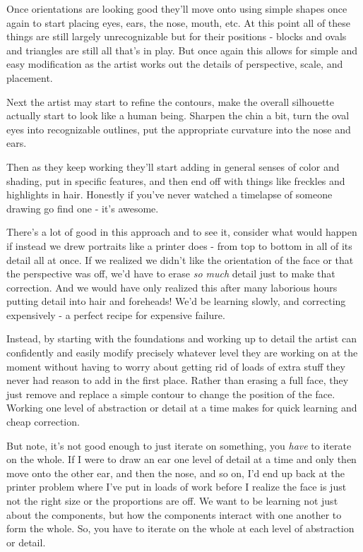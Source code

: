 \documentclass[11pt,a5paper]{book}
\begin{document}
Once orientations are looking good they'll move onto using simple shapes once again to start placing eyes, ears, the nose, mouth, etc. At this point all of these things are still largely unrecognizable but for their positions - blocks and ovals and triangles are still all that's in play. But once again this allows for simple and easy modification as the artist works out the details of perspective, scale, and placement.
\newline

Next the artist may start to refine the contours, make the overall silhouette actually start to look like a human being. Sharpen the chin a bit, turn the oval eyes into recognizable outlines, put the appropriate curvature into the nose and ears. 
\newline

Then as they keep working they'll start adding in general senses of color and shading, put in specific features, and then end off with things like freckles and highlights in hair. Honestly if you've never watched a timelapse of someone drawing go find one - it's awesome.
\newline

There's a lot of good in this approach and to see it, consider what would happen if instead we drew portraits like a printer does - from top to bottom in all of its detail all at once. If we realized we didn't like the orientation of the face or that the perspective was off, we'd have to erase \textit{so much} detail just to make that correction. And we would have only realized this after many laborious hours putting detail into hair and foreheads! We'd be learning slowly, and correcting expensively - a perfect recipe for expensive failure. 
\newline

Instead, by starting with the foundations and working up to detail the artist can confidently and easily modify precisely whatever level they are working on at the moment without having to worry about getting rid of loads of extra stuff they never had reason to add in the first place. Rather than erasing a full face, they just remove and replace a simple contour to change the position of the face. Working one level of abstraction or detail at a time makes for quick learning and cheap correction.
\newline

But note, it's not good enough to just iterate on something, you \textit{have} to iterate on the whole. If I were to draw an ear one level of detail at a time and only then move onto the other ear, and then the nose, and so on, I'd end up back at the printer problem where I've put in loads of work before I realize the face is just not the right size or the proportions are off. We want to be learning not just about the components, but how the components interact with one another to form the whole. So, you have to iterate on the whole at each level of abstraction or detail.
\newline
\end{document}
